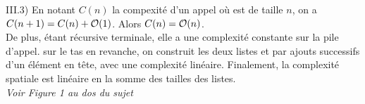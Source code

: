 \begin{question}{III.3) }{}
    En notant $C(n)$ la compexité d'un appel  où  est de taille $n$, on a $C(n+1) = C(n) + \mathcal{O}(1)$. Alors $C(n) = \mathcal{O}(n)$. \\
    De plus,  étant récursive terminale, elle a une complexité constante sur la pile d'appel. sur le tas en revanche, on construit les deux listes  et  par ajouts successifs d'un élément en tête, avec une complexité linéaire. Finalement, la complexité spatiale est linéaire en la somme des tailles des listes. \\ \textit{Voir Figure 1 au dos du sujet}
\end{question}


